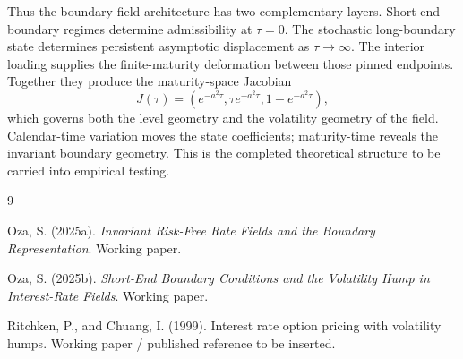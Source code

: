 \documentclass[11pt]{article}
\begin{document}
Thus the boundary-field architecture has two complementary layers. Short-end boundary regimes determine admissibility at \(\tau=0\). The stochastic long-boundary state determines persistent asymptotic displacement as \(\tau\to\infty\). The interior loading supplies the finite-maturity deformation between those pinned endpoints. Together they produce the maturity-space Jacobian
\[
J(\tau)
=
\left(
 e^{-a^2\tau},
 \tau e^{-a^2\tau},
 1-e^{-a^2\tau}
\right),
\]
which governs both the level geometry and the volatility geometry of the field. Calendar-time variation moves the state coefficients; maturity-time reveals the invariant boundary geometry. This is the completed theoretical structure to be carried into empirical testing.


\begin{thebibliography}{9}

Oza, S. (2025a).
\emph{Invariant Risk-Free Rate Fields and the Boundary Representation}.
Working paper.

Oza, S. (2025b).
\emph{Short-End Boundary Conditions and the Volatility Hump in Interest-Rate Fields}.
Working paper.

Ritchken, P., and Chuang, I. (1999).
Interest rate option pricing with volatility humps.
Working paper / published reference to be inserted.

\end{thebibliography}
\end{document}
